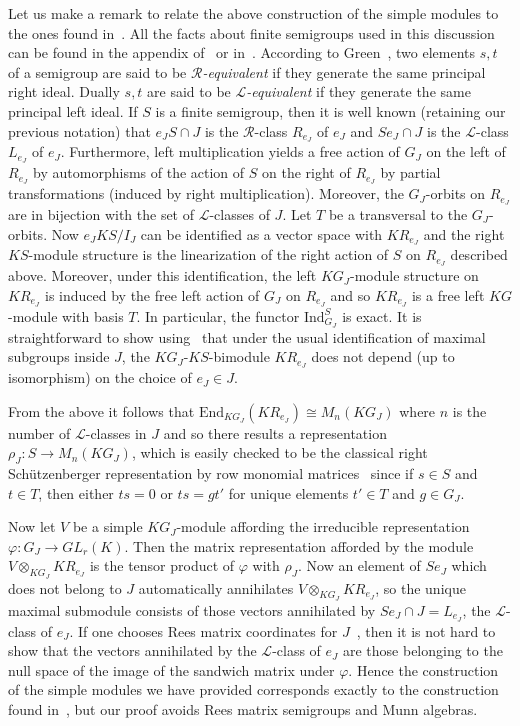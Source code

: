 \documentclass[reqno,11pt]{amsart}
\def\p{\varphi}
\def\R{\mathrel{{\mathscr R}}} %
\def\L{\mathrel{{\mathscr L}}} %
\def\to{\rightarrow}
\numberwithin{equation}{section}
\begin{document}
Let us make a remark to relate the above construction of the simple
modules to the ones found in~\cite{RhodesZalc,LallePet}.   All the
facts about finite semigroups used in this discussion can be found in the
appendix of~\cite{qtheor} or in~\cite{Arbib}. According to
Green~\cite{Green}, two elements $s,t$ of a semigroup are said to be
\emph{$\mathscr R$-equivalent} if they generate the same principal right
ideal.  Dually $s,t$ are said to be \emph{$\L$-equivalent} if they generate
the same principal left ideal.  If $S$ is a finite semigroup, then it
is well known (retaining our previous notation) that $e_JS\cap J$ is the $\R$-class $R_{e_J}$ of $e_J$ and $Se_J\cap J$ is the $\L$-class
$L_{e_J}$ of $e_J$.  Furthermore, left multiplication yields a free action of
$G_J$ on the left of $R_{e_J}$ by automorphisms of the action of $S$
on the right of $R_{e_J}$ by partial transformations (induced by right
multiplication).  Moreover, the $G_J$-orbits on $R_{e_J}$ are in bijection
with the set of $\L$-classes of $J$.  Let $T$ be a transversal to the
$G_J$-orbits.  Now $e_JKS/I_J$ can be identified as a vector space
with $KR_{e_J}$ and the right $KS$-module structure is the
linearization of the right action of $S$ on $R_{e_J}$ described
above.  Moreover, under this identification, the left $KG_J$-module
structure on $KR_{e_J}$ is induced by the free left action of $G_J$ on
$R_{e_J}$ and so $KR_{e_J}$ is a free left $KG$-module with basis
$T$. In particular, the functor $\mathrm{Ind}_{G_J}^S$ is exact.
It is straightforward to show using~\cite[Theorem~10.4.1]{GM} that under the
usual identification of maximal subgroups inside $J$, the 
$KG_J$-$KS$-bimodule $KR_{e_J}$ does not depend (up to isomorphism) on the
choice of $e_J\in J$. 

From the above it follows that  
$\mathrm{End}_{KG_J}(KR_{e_J})\cong M_n(KG_J)$ where $n$
is the number of $\L$-classes in $J$ and so there results a representation
$\rho_J:S\to M_n(KG_J)$, which is easily checked to be the classical right
Sch\"utzenberger representation by row monomial
matrices~\cite{CP,Schutzmonomial} since if $s\in S$ and $t\in T$, then
either $ts=0$ or $ts = gt'$ for unique elements $t'\in T$ and $g\in
G_J$.

Now let $V$ be a simple $KG_J$-module affording the
irreducible representation $\p:G_J\to GL_r(K)$. Then the matrix
representation afforded by the module \mbox{$V\otimes_{KG_J}KR_{e_J}$} is
the tensor product of $\p$ with $\rho_J$.  Now an element of $Se_J$
which does not belong to $J$ automatically annihilates
$V\otimes_{KG_J}KR_{e_J}$, so the unique maximal submodule consists of
those vectors annihilated by $Se_J\cap J = L_{e_J}$, the $\L$-class of
$e_J$.  If one chooses Rees matrix coordinates for $J$~\cite{CP,qtheor}, then
it is not hard to show that the vectors annihilated by the $\L$-class
of $e_J$ are those belonging to the null space of the image of the
sandwich matrix under $\p$.  Hence the construction of the simple
modules we have provided corresponds exactly to the construction found
in~\cite{RhodesZalc,LallePet}, but our proof avoids Rees matrix
semigroups and Munn algebras.
\end{document}
